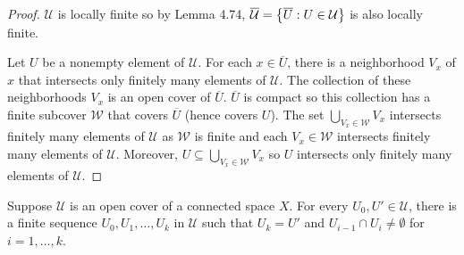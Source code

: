 \begin{proof}
	$\mathcal{U}$ is locally finite so by Lemma 4.74, $\overline{\mathcal{U}} = \left\{{ \overline{U} : U\in\mathcal{U} }\right\}$ is also locally finite.

	Let $U$ be a nonempty element of $\mathcal{U}$. For each $x\in \overline{U}$, there is a neighborhood $V_{x}$ of $x$ that intersects only finitely many elements of $\mathcal{U}$. The collection of these neighborhoods $V_{x}$ is an open cover of $\overline{U}$. $\overline{U}$ is compact so this collection has a finite subcover $\mathcal{W}$ that covers $\overline{U}$ (hence covers $U$). The set $\bigcup_{V_{x}\in\mathcal{W}} V_{x}$ intersects finitely many elements of $\mathcal{U}$ as $\mathcal{W}$ is finite and each $V_{x}\in\mathcal{W}$ intersects finitely many elements of $\mathcal{U}$. Moreover, $U \subseteq \bigcup_{V_{x}\in\mathcal{W}} V_{x}$ so $U$ intersects only finitely many elements of $\mathcal{U}$.
\end{proof}

\begin{note}\label{note:connected-chain}
	Suppose $\mathcal{U}$ is an open cover of a connected space $X$. For every $U_{0}, U' \in \mathcal{U}$, there is a finite sequence $U_{0}, U_{1}, \ldots, U_{k}$ in $\mathcal{U}$ such that $U_{k} = U'$ and $U_{i-1}\cap U_{i} \ne \emptyset$ for $i = 1, \ldots, k$.
\end{note}

